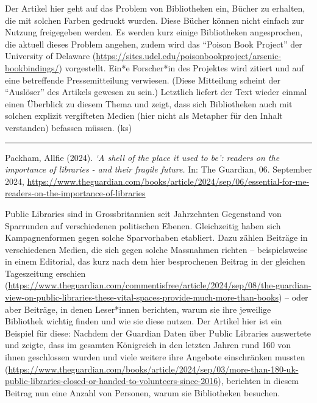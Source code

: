 \documentclass[a4paper,
fontsize=11pt,
oneside,
numbers=noperiodatend,
parskip=half-,
bibliography=totoc,
final
]{scrartcl}
\begin{document}
Der Artikel hier geht auf das Problem von Bibliotheken ein, Bücher zu
erhalten, die mit solchen Farben gedruckt wurden. Diese Bücher können
nicht einfach zur Nutzung freigegeben werden. Es werden kurz einige
Bibliotheken angesprochen, die aktuell dieses Problem angehen, zudem
wird das ``Poison Book Project'' der University of Delaware
(\url{https://sites.udel.edu/poisonbookproject/arsenic-bookbindings/})
vorgestellt. Ein*e Forscher*in des Projektes wird zitiert und auf eine
betreffende Pressemitteilung verwiesen. (Diese Mitteilung scheint der
``Auslöser'' des Artikels gewesen zu sein.) Letztlich liefert der Text
wieder einmal einen Überblick zu diesem Thema und zeigt, dass sich
Bibliotheken auch mit solchen explizit vergifteten Medien (hier nicht
als Metapher für den Inhalt verstanden) befassen müssen. (ks)

\begin{center}\rule{0.5\linewidth}{0.5pt}\end{center}

Packham, Allfie (2024). \emph{`A shell of the place it used to be':
readers on the importance of libraries - and their fragile future.} In:
The Guardian, 06. September 2024,
\url{https://www.theguardian.com/books/article/2024/sep/06/essential-for-me-readers-on-the-importance-of-libraries}

Public Libraries sind in Grossbritannien seit Jahrzehnten Gegenstand von
Sparrunden auf verschiedenen politischen Ebenen. Gleichzeitig haben sich
Kampagnenformen gegen solche Sparvorhaben etabliert. Dazu zählen
Beiträge in verschiedenen Medien, die sich gegen solche Massnahmen
richten -- beispielsweise in einem Editorial, das kurz nach dem hier
besprochenen Beitrag in der gleichen Tageszeitung erschien
(\url{https://www.theguardian.com/commentisfree/article/2024/sep/08/the-guardian-view-on-public-libraries-these-vital-spaces-provide-much-more-than-books})
-- oder aber Beiträge, in denen Leser*innen berichten, warum sie ihre
jeweilige Bibliothek wichtig finden und wie sie diese nutzen. Der
Artikel hier ist ein Beispiel für diese: Nachdem der Guardian Daten über
Public Libraries auswertete und zeigte, dass im gesamten Königreich in
den letzten Jahren rund 160 von ihnen geschlossen wurden und viele
weitere ihre Angebote einschränken mussten
(\url{https://www.theguardian.com/books/article/2024/sep/03/more-than-180-uk-public-libraries-closed-or-handed-to-volunteers-since-2016}),
berichten in diesem Beitrag nun eine Anzahl von Personen, warum sie
Bibliotheken besuchen.
\end{document}
